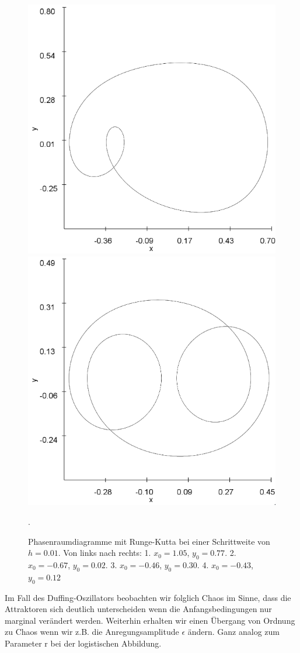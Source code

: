 \documentclass[11,5pt, twoside]{article}
\begin{document}
\begin{figure}[!htbp]
\includegraphics[scale=0.20]{duffing-awp4-500k-nach-500k-h0,01-runge}
\includegraphics[scale=0.20]{duffing-awp5-500k-nach-500k-h0,01-runge}
\caption{Phasenraumdiagramme mit Runge-Kutta bei einer Schrittweite von $h=0.01$. Von links nach rechts: 1. $x_0=1.05$, $y_0=0.77$. 2. $x_0=-0.67$, $y_0=0.02$. 3. $x_0=-0.46$, $y_0=0.30$. 4. $x_0=-0.43$, $y_0=0.12$}. 
\label{fig:duffing-allawp}
\end{figure}
Im Fall des Duffing-Oszillators beobachten wir folglich Chaos im Sinne, dass die Attraktoren sich deutlich unterscheiden wenn die Anfangsbedingungen nur marginal verändert werden. Weiterhin erhalten wir einen Übergang von Ordnung zu Chaos wenn wir z.B. die Anregungsamplitude $\epsilon$ ändern. Ganz analog zum Parameter r bei der logistischen Abbildung.
\end{document}
